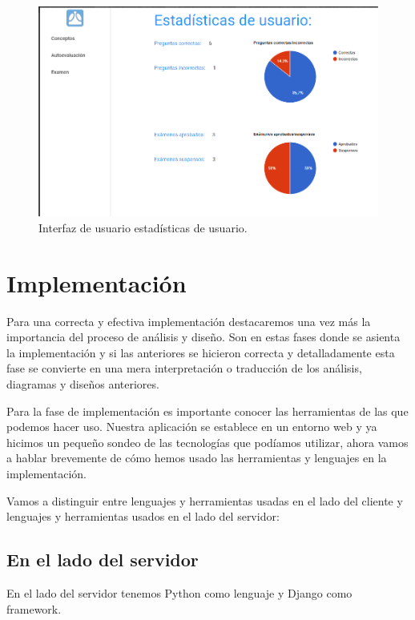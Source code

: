 \begin{figure}[!ht]
  \begin{center}
    \includegraphics[width=1\textwidth]{../images/interfaz_estadisticas.png}
    \caption{Interfaz de usuario estadísticas de usuario.}
    \label{fig:interfaz_estadisticas}
  \end{center}
\end{figure}



\newpage

\section{Implementación}

Para una correcta y efectiva implementación destacaremos una vez más la importancia del proceso de análisis y diseño. Son en estas fases donde se asienta la implementación y si las anteriores se hicieron correcta y detalladamente esta fase se convierte en una mera interpretación o traducción de los análisis, diagramas y diseños anteriores. 

\bigskip
Para la fase de implementación es importante conocer las herramientas de las que podemos hacer uso. Nuestra aplicación se establece en un entorno web y ya hicimos un pequeño sondeo de las tecnologías que podíamos utilizar, ahora vamos a hablar brevemente de cómo hemos usado las herramientas y lenguajes en la implementación.

\bigskip
Vamos a distinguir entre lenguajes y herramientas usadas en el lado del cliente y lenguajes y herramientas usados en el lado del servidor:

\subsection{En el lado del servidor}
  En el lado del servidor tenemos Python como lenguaje y Django como framework.

